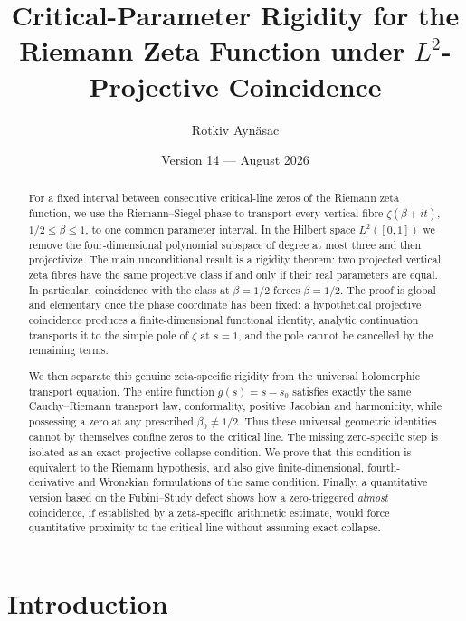 \documentclass[11pt]{amsart}
\title[Critical-Parameter Rigidity for the Riemann Zeta Function]{Critical-Parameter Rigidity for the Riemann Zeta Function under $L^2$-Projective Coincidence}
\author{Rotkiv Aynäsac}
\date{Version 14 --- August 2026}
\numberwithin{equation}{section}
\begin{document}
\begin{abstract}
For a fixed interval between consecutive critical-line zeros of the Riemann
zeta function, we use the Riemann--Siegel phase to transport every vertical
fibre $\zeta(\beta+it)$, $1/2\leq\beta\leq1$, to one common parameter
interval.  In the Hilbert space $L^2([0,1])$ we remove the four-dimensional
polynomial subspace of degree at most three and then projectivize.  The main
unconditional result is a rigidity theorem: two projected vertical zeta
fibres have the same projective class if and only if their real parameters
are equal.  In particular, coincidence with the class at $\beta=1/2$ forces
$\beta=1/2$.  The proof is global and elementary once the phase coordinate
has been fixed: a hypothetical projective coincidence produces a
finite-dimensional functional identity, analytic continuation transports it
to the simple pole of $\zeta$ at $s=1$, and the pole cannot be cancelled by
the remaining terms.

We then separate this genuine zeta-specific rigidity from the universal
holomorphic transport equation.  The entire function $g(s)=s-s_0$ satisfies
exactly the same Cauchy--Riemann transport law, conformality, positive
Jacobian and harmonicity, while possessing a zero at any prescribed
$\beta_0\neq1/2$.  Thus these universal geometric identities cannot by
themselves confine zeros to the critical line.  The missing zero-specific
step is isolated as an exact projective-collapse condition.  We prove that
this condition is equivalent to the Riemann hypothesis, and also give
finite-dimensional, fourth-derivative and Wronskian formulations of the same
condition.  Finally, a quantitative version based on the Fubini--Study defect
shows how a zero-triggered \emph{almost} coincidence, if established by a
zeta-specific arithmetic estimate, would force quantitative proximity to the
critical line without assuming exact collapse.
\end{abstract}

\maketitle
\tableofcontents
\bigskip

\section{Introduction}
\label{sec:introduction}
\end{document}
